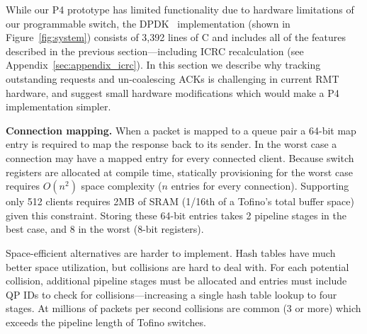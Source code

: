 While our P4 prototype has limited functionality due to hardware
limitations of our programmable switch, the DPDK
\sword\ implementation (shown in Figure~\ref{fig:system}) consists of
3,392 lines of C and includes all of the features described in the
previous section---including ICRC recalculation (see
Appendix~\ref{sec:appendix_icrc}).  In this section we describe why
tracking outstanding requests and un-coalescing ACKs is challenging in
current RMT hardware, and suggest small hardware modifications which
would make a P4 implementation simpler.


\textbf{Connection mapping.} When a packet is mapped to a queue pair a
64-bit map entry is required to map the response back to its
sender. In the worst case a connection may have a mapped entry for
every connected client. Because switch registers are allocated at
compile time, statically provisioning for the worst case requires
$O(n^2)$ space complexity ($n$ entries for every connection).
Supporting only 512 clients requires 2MB of SRAM (1/16th of a Tofino's
total buffer space) given this constraint. Storing these 64-bit
entries takes 2 pipeline stages in the best case, and 8 in the worst
(8-bit registers).

Space-efficient alternatives are harder to implement. Hash tables have much
better space utilization, but collisions are hard to deal with. For each
potential collision, additional pipeline stages must be allocated and entries
must include QP IDs to check for collisions---increasing a single hash table
lookup to four stages.
At millions of packets per second collisions are common (3 or more) which
exceeds the pipeline length of Tofino switches.





